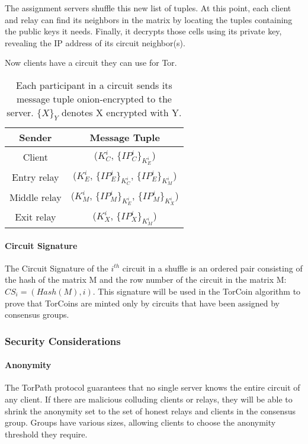The assignment servers shuffle this new list of tuples. At this point, each
client and relay can find its neighbors in the matrix by locating the tuples
containing the public keys it needs. Finally, it decrypts those cells using
its private key, revealing the IP address of its circuit neighbor(s).

Now clients have a circuit they can use for Tor.

{\renewcommand{\arraystretch}{2}
\begin{table}[h]
\centering
  \begin{tabular}{ |c | c| }
  \hline
  \textbf{Sender} & \textbf{Message Tuple} \\ \hline
  Client & ($K^{i}_{C}$, $\{IP^{i}_{C}\}_{K^{i}_{E}}$) \\ \hline
  Entry relay & ($K^{i}_{E}$, $\{IP^{i}_{E}\}_{K^{i}_{C}}$, $\{IP^{i}_{E}\}_{K^{i}_{M}}$) \\ \hline
  Middle relay & ($K^{i}_{M}$, $\{IP^{i}_{M}\}_{K^{i}_{E}}$, $\{IP^{i}_{M}\}_{K^{i}_{X}}$) \\ \hline
  Exit relay & ($K^{i}_{X}$, $\{IP^{i}_{X}\}_{K^{i}_{M}}$) \\ \hline
  \end{tabular}
  \vspace{.5cm}

  \caption{Each participant in a circuit sends its message 
  tuple onion-encrypted to the server. $\{X\}_{Y}$ denotes X encrypted with Y.}
  \label{table:message_format}
\end{table}

\vspace{-1cm}

\paragraph{Circuit Signature} The Circuit Signature of the $i^{th}$ circuit in
a shuffle is an ordered pair consisting of the hash of the matrix M and the
row number of the circuit in the matrix M: $CS_i = (Hash(M), i)$. This
signature will be used in the TorCoin algorithm to prove that TorCoins are
minted only by circuits that have been assigned by consensus groups.

\subsubsection{Security Considerations} 

\paragraph{Anonymity} The TorPath protocol guarantees that no single
server knows the entire circuit of any client. If there are malicious
colluding clients or relays, they will be able to shrink the anonymity set to
the set of honest relays and clients in the consensus group.  Groups have
various sizes, allowing clients to choose the anonymity threshold they
require.

}
